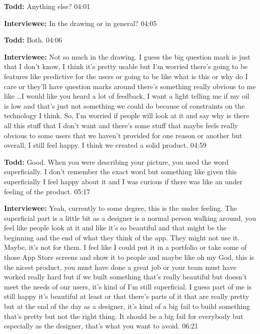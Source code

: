 \textbf{Todd:} Anything else?  04:01

\textbf{Interviewee:} In the drawing or in general?  04:05

\textbf{Todd:} Both.  04:06

\textbf{Interviewee:} Not so much in the drawing.  I guess the big question mark is just that I don't know, I think it's pretty usable but I'm worried there's going to be features like predictive for the users or going to be like what is this or why do I care or they'll have question marks around there's something really obvious to me like \ldots I would like you heard a lot of feedback, I want a light telling me if my oil is low and that's just not something we could do because of constraints on the technology I think.  So, I'm worried if people will look at it and say why is there all this stuff that I don't want and there's some stuff that maybe feels really obvious to some users that we haven't provided for one reason or another but overall, I still feel happy.  I think we created a solid product.  04:59

\textbf{Todd:} Good.  When you were describing your  picture, you used the word superficially.  I don't remember the exact word but something like given this superficially I feel happy about it and I was curious if there was like an under feeling of the product.  05:17

\textbf{Interviewee:} Yeah, currently to some degree, this is the under feeling.  The superficial part is a little bit as a designer is a normal person walking around, you feel like people look at it and like it's so beautiful and that might be the beginning and the end of what they think of the app.  They might not use it.  Maybe, it's not for them.  I feel like I could put it in a portfolio or take some of those App Store screens and show it to people and maybe like oh my God, this is the nicest product, you must have done a great job or your team must have worked really hard but if we built something that's really beautiful but doesn't meet the needs of our users, it's kind of I'm still superficial.  I guess part of me is still happy it's beautiful at least or that there's parts of it that are really pretty but at the end of the day as a designer, it's kind of a big fail to build something that's pretty but not the right thing.  It should be a big fail for everybody but especially as the designer, that's what you want to avoid.  06:21